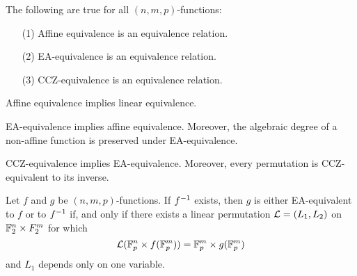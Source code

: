 \begin{proposition}\label{proposition_1.1.5}
  The following are true for all $(n,m,p)$-functions:
  \begin{enumerate}
    \item[(1)] Affine equivalence is an equivalence relation.

    \item[(2)] EA-equivalence is an equivalence relation.

    \item[(3)] CCZ-equivalence is an equivalence relation.
  \end{enumerate}
\end{proposition}
\begin{corollary}
  Affine equivalence implies linear equivalence.
\end{corollary}
\begin{corollary}
  EA-equivalence implies affine equivalence. Moreover, the algebraic degree of a
  non-affine function is preserved under EA-equivalence.
\end{corollary}
\begin{corollary}
  CCZ-equivalence implies EA-equivalence. Moreover, every permutation is
  CCZ-equivalent to its inverse.
\end{corollary}

\begin{proposition}\label{proposition_1.1.6}
  Let $f$ and  $g$ be $(n,m,p)$-functions. If $f^{-1}$ exists, then $g$ is
  either EA-equivalent to $f$ or to $f^{-1}$ if, and only if there exists a
  linear permutation $\mathcal{L}=(L_1,L_2)$ on $\mathbb{F}_2^n \times F_2^m$ for which
  \begin{equation*}
    \mathcal{L}(\mathbb{F}_p^n \times f(\mathbb{F}_p^m))=\mathbb{F}_p^m \times g(\mathbb{F}_p^m)
  \end{equation*}
  and $L_1$ depends only on one variable.
\end{proposition}
